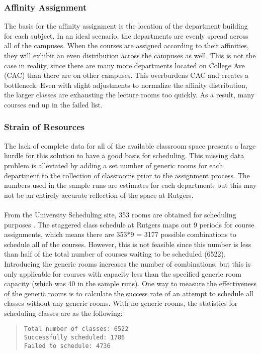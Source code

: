 \documentclass[12pt]{article}
\begin{document}
\subsubsection{Affinity Assignment}
The basis for the affinity assignment is the location of the department building for each subject. In an ideal scenario, the departments are evenly spread across all of the campuses. When the courses are assigned according to their affinities, they will exhibit an even distribution across the campuses as well. This is not the case in reality, since there are many more departments located on College Ave (CAC) than there are on other campuses. This overburdens CAC and creates a bottleneck. Even with slight adjustments to normalize the affinity distribution, the larger classes are exhausting the lecture rooms too quickly. As a result, many courses end up in the failed list.

\subsubsection{Strain of Resources}
The lack of complete data for all of the available classroom space presents a large hurdle for this solution to have a good basis for scheduling. This missing data problem is alleviated by adding a set number of generic rooms for each department to the collection of classrooms prior to the assignment process. The numbers used in the sample runs are estimates for each department, but this may not be an entirely accurate reflection of the space at Rutgers. 
\\\\
From the University Scheduling site, 353 rooms are obtained for scheduling purposes \cite{citation3}. The staggered class schedule at Rutgers maps out 9 periods for course assignments, which means there are 353*9 = 3177 possible combinations to schedule all of the courses. However, this is not feasible since this number is less than half of the total number of courses waiting to be scheduled (6522). Introducing the generic rooms increases the number of combinations, but this is only applicable for courses with capacity less than the specified generic room capacity (which was 40 in the sample runs). One way to measure the effectiveness of the generic rooms is to calculate the success rate of an attempt to schedule all classes without any generic rooms. With no generic rooms, the statistics for scheduling classes are as the following:

\begin{quote}
\begin{verbatim}
Total number of classes: 6522
Successfully scheduled: 1786
Failed to schedule: 4736
\end{verbatim}
\end{quote}
\end{document}
